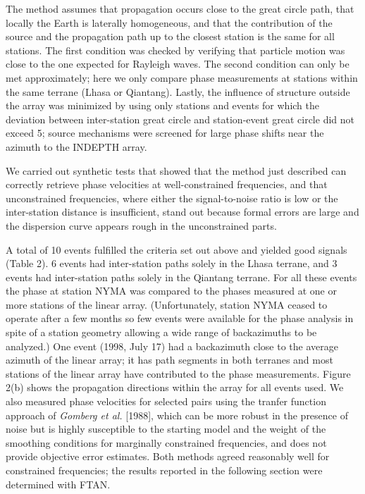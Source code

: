 \documentclass[12pt]{article}
\begin{document}
The method assumes that propagation occurs close to the great circle path, that locally the Earth is 
laterally homogeneous, and that the contribution of the source and the propagation path up to the closest 
station is the same for all stations.  The first condition was checked by verifying that particle motion 
was close to the one expected for Rayleigh waves.  The second condition can only be met approximately; here 
we only compare phase measurements at stations within the same terrane (Lhasa or Qiantang).  Lastly, the 
influence of structure outside the array was minimized by using only stations and events for which the 
deviation between inter-station great circle and station-event great circle did not exceed 5\dg; source 
mechanisms were screened for large phase shifts near the azimuth to the INDEPTH array. 

We carried out synthetic tests that showed that the method just described can correctly retrieve phase 
velocities at well-constrained frequencies, and that unconstrained frequencies, where either the 
signal-to-noise ratio is low or the inter-station distance is insufficient, stand out because formal errors 
are large and the dispersion curve appears rough in the unconstrained parts. 

A total of 10 events fulfilled the criteria set out above and yielded good signals (Table 2).  6 events had 
inter-station paths solely in the Lhasa terrane, and 3 events had inter-station paths solely in the 
Qiantang terrane.  For all these events the phase at station NYMA was compared to the phases measured at 
one or more stations of the linear array. (Unfortunately, station NYMA ceased to operate after a few months 
so few events were available for the phase analysis in spite of a station geometry allowing a wide range of 
backazimuths to be analyzed.)  One event (1998, July 17) had a backazimuth close to the average azimuth of 
the linear array; it has path segments in both terranes and most stations of the linear array have 
contributed to the phase measurements.  Figure 2(b) shows the propagation directions within the array for 
all events used.  We also measured phase velocities for selected pairs using the tranfer function approach 
of {\it Gomberg et al.} [1988], which can be more robust in the presence of noise but is highly susceptible 
to the starting model and the weight of the smoothing conditions for marginally constrained frequencies, and does not provide objective error estimates.  
Both methods agreed reasonably well for constrained frequencies; the results reported in
the following section were determined with FTAN. 
\end{document}
